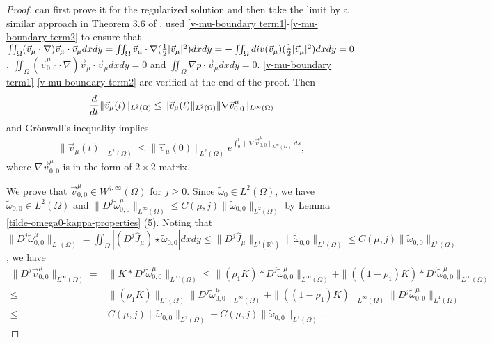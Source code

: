 \documentclass[1 [leqno, 11pt]{amsart}
\numberwithin{equation}{section}
\begin{document}
\begin{CJK*}{GBK}{song}
\begin{appendix}
\begin{proof}
can first prove it for the regularized solution and then take the limit by a similar approach in Theorem 3.6 of \cite{Majda-Bertozzi02}.
used \eqref{v-mu-boundary term1}-\eqref{v-mu-boundary term2} to ensure that $\iint_{\Omega}(\vec{v}_{\mu}\cdot\nabla)\vec{v}_{\mu}\cdot\vec{v}_{\mu}dxdy
=\iint_{\Omega}\vec{v}_{\mu}\cdot \nabla({1\over2}|\vec{v}_{\mu}|^2) dxdy=-\iint_{\Omega}div(\vec{v}_{\mu})({1\over2}|\vec{v}_{\mu}|^2) dxdy=0$, $\iint_{\Omega}(\vec{v}_{0,0}^{\mu}\cdot\nabla)\vec{v}_{\mu}\cdot\vec{v}_{\mu}dxdy=0$ and
$\iint_{\Omega}\nabla p\cdot\vec{v}_{\mu}dxdy=0$. \eqref{v-mu-boundary term1}-\eqref{v-mu-boundary term2} are verified at the end of the proof.
\fi
Then
\begin{align}\label{basic energy estimate-eq}
{d\over dt}\|\vec{v}_{\mu}(t)\|_{L^2(\Omega)}\leq \|\vec{v}_{\mu}(t)\|_{L^2(\Omega)}\|\nabla\vec{v}_{0,0}^{\mu}\|_{L^\infty(\Omega)}
 \end{align}
and Gr\"{o}nwall's inequality implies
\begin{align}\label{basic energy estimate-gronwall}
\|\vec{v}_{\mu}(t)\|_{L^2(\Omega)}\leq \|\vec{v}_{\mu}(0)\|_{L^2(\Omega)}e^{\int_0^t\|\nabla \vec{v}_{0,0}^{\mu}\|_{L^\infty(\Omega)}ds},
 \end{align}
 where $\nabla \vec{v}_{0,0}^{\mu}$ is in the form of  $2\times2$ matrix.

 We prove that $\vec{v}_{0,0}^{\mu}\in W^{j,\infty}(\Omega)$ for $j\geq0$. Since $\tilde \omega_0\in L^2(\Omega)$, we have $\tilde \omega_{0,0}\in L^2(\Omega)$ and $\|D^j\tilde \omega_{0,0}^{\mu}\|_{L^\infty(\Omega)}\leq C(\mu,j)\|\tilde \omega_{0,0}\|_{L^2(\Omega)}$ by Lemma \ref{tilde-omega0-kappa-properties} (5). Noting that $\|D^j\tilde \omega_{0,0}^{\mu}\|_{L^1(\Omega)}=\iint_\Omega|(D^j\hat J_\mu)\star\tilde \omega_{0,0}|dxdy\leq \|D^j\hat J_\mu\|_{L^1(\mathbb{R}^2)}\|\tilde \omega_{0,0}\|_{L^1(\Omega)}\leq C(\mu,j)\|\tilde \omega_{0,0}\|_{L^1(\Omega)}$, we have
 \begin{align*}
 \|D^j\vec{v}_{0,0}^{\mu}\|_{L^\infty(\Omega)}=&\|K\ast D^j\tilde\omega_{0,0}^{\mu}\|_{L^\infty(\Omega)}\leq \|(\rho_1K)*D^j\tilde \omega_{0,0}^{\mu}\|_{L^\infty(\Omega)}+\|((1-\rho_1)K)*D^j\tilde \omega_{0,0}^{\mu}\|_{L^\infty(\Omega)}\\
 \leq&\|(\rho_1K)\|_{L^1(\Omega)}\|D^j\tilde \omega_{0,0}^{\mu}\|_{L^\infty(\Omega)}+\|((1-\rho_1)K)\|_{L^\infty(\Omega)}\|D^j\tilde \omega_{0,0}^{\mu}\|_{L^1(\Omega)}\\
 \leq&C(\mu,j)\|\tilde \omega_{0,0}\|_{L^2(\Omega)}+C(\mu,j)\|\tilde \omega_{0,0}\|_{L^1(\Omega)}.
 \end{align*}



\end{proof}
\end{appendix}
\end{CJK*}
\end{document}
